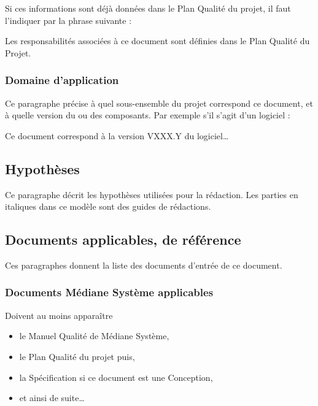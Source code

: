 \documentclass[
  10pt,
]{book}
\providecommand{\tightlist}{%
  \setlength{\itemsep}{0pt}\setlength{\parskip}{0pt}}
\begin{document}
Si ces informations sont déjà données dans le Plan Qualité du projet, il
faut l'indiquer par la phrase suivante :

Les responsabilités associées à ce document sont définies dans le Plan
Qualité du Projet.

\hypertarget{domaine-dapplication}{%
\subsubsection{Domaine d'application}\label{domaine-dapplication}}

Ce paragraphe précise à quel sous-ensemble du projet correspond ce
document, et à quelle version du ou des composants. Par exemple s'il
s'agit d'un logiciel :

Ce document correspond à la version VXXX.Y du logiciel\ldots{}

\hypertarget{hypothuxe8ses}{%
\subsection{Hypothèses}\label{hypothuxe8ses}}

Ce paragraphe décrit les hypothèses utilisées pour la rédaction. Les
parties en italiques dans ce modèle sont des guides de rédactions.

\hypertarget{documents-applicables-de-ruxe9fuxe9rence}{%
\subsection{Documents applicables, de
référence}\label{documents-applicables-de-ruxe9fuxe9rence}}

Ces paragraphes donnent la liste des documents d'entrée de ce document.

\hypertarget{documents-muxe9diane-systuxe8me-applicables}{%
\subsubsection{Documents Médiane Système
applicables}\label{documents-muxe9diane-systuxe8me-applicables}}

Doivent au moins apparaître

\begin{itemize}
\tightlist
\item
  le Manuel Qualité de Médiane Système,
\item
  le Plan Qualité du projet puis,
\item
  la Spécification si ce document est une Conception,
\item
  et ainsi de suite\ldots{}
\end{itemize}
\end{document}
